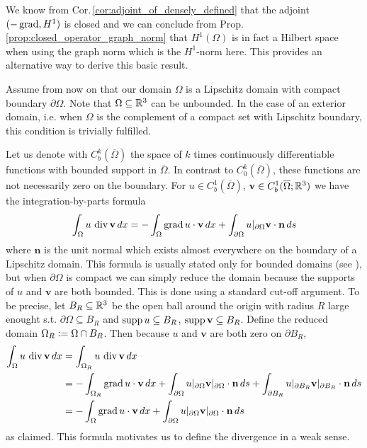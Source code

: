 \documentclass[../master_thesis.tex]{subfiles}
\begin{document}
We know from Cor.\,\ref{cor:adjoint_of_densely_defined} 
that the adjoint $(-\operatorname{grad}, H^1)$ is closed and 
we can conclude from Prop.\,\ref{prop:closed_operator_graph_norm} 
that $H^1(\Omega)$ is in fact a Hilbert space 
when using the graph norm which is the $H^1$-norm here. This provides an alternative 
way to derive this basic result.

Assume from now on that our domain $\Omega$ is a Lipschitz domain 
with compact boundary $\partial \Omega$. Note that $\Omega \subseteq \mathbb{R}^3$ 
can be unbounded. In the case of an exterior domain, i.e. when $\Omega$ is 
the complement of a compact set with Lipschitz boundary, this condition is trivially fulfilled.

Let us denote with $C^k_b(\overline{\Omega})$ the space of $k$ times continuously
differentiable functions with bounded support in $\overline{\Omega}$. 
In contrast to $C^k_0(\overline{\Omega})$, these functions are not necessarily zero on the 
boundary.
For $u \in C_b^1(\overline{\Omega})$, $\mathbf{v} \in C_b^1(\overline{\Omega};\mathbb{R}^3)$ we 
have the integration-by-parts formula
\begin{align}
    \int_\Omega u \, \diver \mathbf{v} \, dx
    = - \int_\Omega \grad u \cdot \mathbf{v} \, dx
        + \int_{\partial \Omega} u|_{\partial \Omega} \mathbf{v}\cdot\mathbf{n} \, ds
        \label{eq:integration_by_parts_C1}
\end{align}
where $\mathbf{n}$ is the unit normal which exists almost everywhere on the boundary of a 
Lipschitz domain. This formula is usually stated only for 
bounded domains (see \cite[Cor.\,3.20]{monk}), but when $\partial \Omega$ is compact 
we can simply reduce the domain 
because the supports of $u$ and $\mathbf{v}$ are both bounded. This is done using 
a standard cut-off argument.
To be precise, let $B_R \subseteq \mathbb{R}^3$ be the open ball around the origin 
with radius $R$ large enought s.t. $\partial \Omega \subseteq B_R$ and 
$\operatorname{supp} u \subseteq B_R$, $\operatorname{supp} \mathbf{v} \subseteq B_R$.
Define the reduced domain $\Omega_R \vcentcolon= \Omega \cap B_R$. 
Then because $u$ and $\mathbf{v}$ are both zero on $\partial B_R$,
\begin{align*}
    \int_\Omega u \, \operatorname{div} \mathbf{v} \, dx
    &= \int_{\Omega_R} u \, \operatorname{div} \mathbf{v} \, dx
    \\ &= - \int_{\Omega_R} \operatorname{grad} u \cdot \mathbf{v} \, dx
        + \int_{\partial \Omega} u|_{\partial \Omega} \mathbf{v}|_{\partial \Omega} \cdot\mathbf{n} \, ds
        + \int_{\partial B_R} u|_{\partial B_R} \mathbf{v}|_{\partial B_R} \cdot\mathbf{n} \, ds
    \\ &= - \int_\Omega \operatorname{grad} u \cdot \mathbf{v} \, dx
        + \int_{\partial \Omega} u|_{\partial \Omega} \mathbf{v}|_{\partial \Omega}\cdot\mathbf{n} \, ds
\end{align*}
as claimed. This formula motivates us to define the divergence in a
weak sense.
\end{document}
